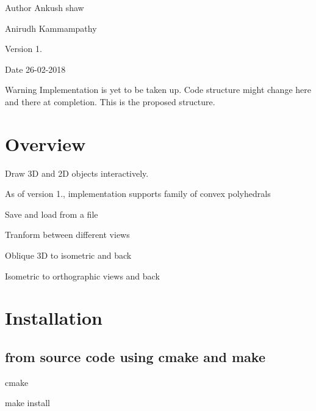 \begin{DoxyAuthor}{Author}
Ankush shaw 

Anirudh Kammampathy 
\end{DoxyAuthor}
\begin{DoxyVersion}{Version}
1. 
\end{DoxyVersion}
\begin{DoxyDate}{Date}
26-\/02-\/2018 
\end{DoxyDate}
\begin{DoxyWarning}{Warning}
Implementation is yet to be taken up. Code structure might change here and there at completion. This is the proposed structure.
\end{DoxyWarning}
\hypertarget{index_Functionality}{}\section{Overview}\label{index_Functionality}

\begin{DoxyEnumerate}
\item Draw 3D and 2D objects interactively.
\item As of version 1., implementation supports family of convex polyhedrals
\item Save and load from a file
\item Tranform between different views
\begin{DoxyItemize}
\item Oblique 3D to isometric and back
\item Isometric to orthographic views and back
\end{DoxyItemize}
\end{DoxyEnumerate}\hypertarget{index_Installation}{}\section{Installation}\label{index_Installation}
\hypertarget{index_Build}{}\subsection{from source code using cmake and make}\label{index_Build}

\begin{DoxyEnumerate}
\item cmake
\item make install 
\end{DoxyEnumerate}